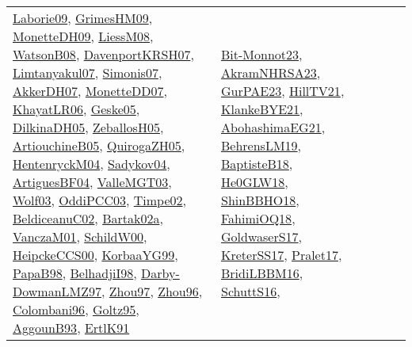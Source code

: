 {\begin{longtable}{lp{3cm}>{\raggedright}p{6cm}>{\raggedright}p{6cm}p{8cm}}
\href{papers/Laborie09.pdf}{Laborie09}\cite{Laborie09}, \href{papers/GrimesHM09.pdf}{GrimesHM09}\cite{GrimesHM09}, \href{papers/MonetteDH09.pdf}{MonetteDH09}\cite{MonetteDH09}, \href{articles/LiessM08.pdf}{LiessM08}\cite{LiessM08}, \href{papers/WatsonB08.pdf}{WatsonB08}\cite{WatsonB08}, \href{papers/DavenportKRSH07.pdf}{DavenportKRSH07}\cite{DavenportKRSH07}, \href{papers/Limtanyakul07.pdf}{Limtanyakul07}\cite{Limtanyakul07}, \href{articles/Simonis07.pdf}{Simonis07}\cite{Simonis07}, \href{papers/AkkerDH07.pdf}{AkkerDH07}\cite{AkkerDH07}, \href{papers/MonetteDD07.pdf}{MonetteDD07}\cite{MonetteDD07}, \href{articles/KhayatLR06.pdf}{KhayatLR06}\cite{KhayatLR06}, \href{papers/Geske05.pdf}{Geske05}\cite{Geske05}, \href{papers/DilkinaDH05.pdf}{DilkinaDH05}\cite{DilkinaDH05}, \href{articles/ZeballosH05.pdf}{ZeballosH05}\cite{ZeballosH05}, \href{papers/ArtiouchineB05.pdf}{ArtiouchineB05}\cite{ArtiouchineB05}, \href{papers/QuirogaZH05.pdf}{QuirogaZH05}\cite{QuirogaZH05}, \href{papers/HentenryckM04.pdf}{HentenryckM04}\cite{HentenryckM04}, \href{papers/Sadykov04.pdf}{Sadykov04}\cite{Sadykov04}, \href{papers/ArtiguesBF04.pdf}{ArtiguesBF04}\cite{ArtiguesBF04}, \href{papers/ValleMGT03.pdf}{ValleMGT03}\cite{ValleMGT03}, \href{papers/Wolf03.pdf}{Wolf03}\cite{Wolf03}, \href{papers/OddiPCC03.pdf}{OddiPCC03}\cite{OddiPCC03}, \href{articles/Timpe02.pdf}{Timpe02}\cite{Timpe02}, \href{papers/BeldiceanuC02.pdf}{BeldiceanuC02}\cite{BeldiceanuC02}, \href{papers/Bartak02a.pdf}{Bartak02a}\cite{Bartak02a}, \href{papers/VanczaM01.pdf}{VanczaM01}\cite{VanczaM01}, \href{articles/SchildW00.pdf}{SchildW00}\cite{SchildW00}, \href{articles/HeipckeCCS00.pdf}{HeipckeCCS00}\cite{HeipckeCCS00}, \href{papers/KorbaaYG99.pdf}{KorbaaYG99}\cite{KorbaaYG99}, \href{articles/PapaB98.pdf}{PapaB98}\cite{PapaB98}, \href{articles/BelhadjiI98.pdf}{BelhadjiI98}\cite{BelhadjiI98}, \href{articles/Darby-DowmanLMZ97.pdf}{Darby-DowmanLMZ97}\cite{Darby-DowmanLMZ97}, \href{articles/Zhou97.pdf}{Zhou97}\cite{Zhou97}, \href{papers/Zhou96.pdf}{Zhou96}\cite{Zhou96}, \href{papers/Colombani96.pdf}{Colombani96}\cite{Colombani96}, \href{papers/Goltz95.pdf}{Goltz95}\cite{Goltz95}, \href{articles/AggounB93.pdf}{AggounB93}\cite{AggounB93}, \href{papers/ErtlK91.pdf}{ErtlK91}\cite{ErtlK91} & \href{papers/Bit-Monnot23.pdf}{Bit-Monnot23}\cite{Bit-Monnot23}, \href{articles/AkramNHRSA23.pdf}{AkramNHRSA23}\cite{AkramNHRSA23}, \href{articles/GurPAE23.pdf}{GurPAE23}\cite{GurPAE23}, \href{papers/HillTV21.pdf}{HillTV21}\cite{HillTV21}, \href{papers/KlankeBYE21.pdf}{KlankeBYE21}\cite{KlankeBYE21}, \href{articles/AbohashimaEG21.pdf}{AbohashimaEG21}\cite{AbohashimaEG21}, \href{papers/BehrensLM19.pdf}{BehrensLM19}\cite{BehrensLM19}, \href{articles/BaptisteB18.pdf}{BaptisteB18}\cite{BaptisteB18}, \href{papers/He0GLW18.pdf}{He0GLW18}\cite{He0GLW18}, \href{articles/ShinBBHO18.pdf}{ShinBBHO18}\cite{ShinBBHO18}, \href{articles/FahimiOQ18.pdf}{FahimiOQ18}\cite{FahimiOQ18}, \href{papers/GoldwaserS17.pdf}{GoldwaserS17}\cite{GoldwaserS17}, \href{articles/KreterSS17.pdf}{KreterSS17}\cite{KreterSS17}, \href{papers/Pralet17.pdf}{Pralet17}\cite{Pralet17}, \href{papers/BridiLBBM16.pdf}{BridiLBBM16}\cite{BridiLBBM16}, \href{papers/SchuttS16.pdf}{SchuttS16}\cite{SchuttS16}, 
\end{longtable}}
